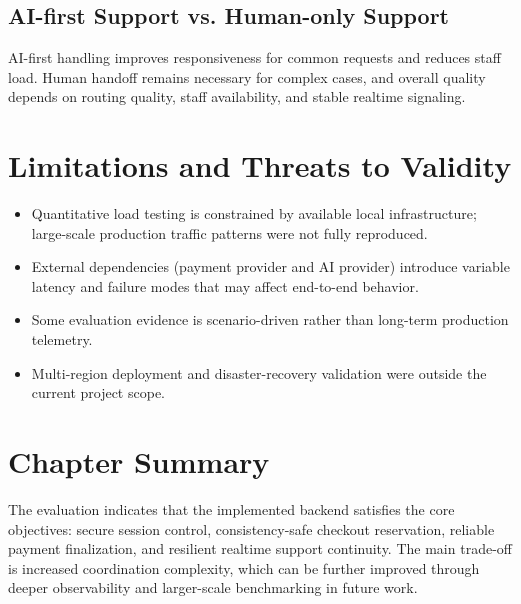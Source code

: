 \subsection{AI-first Support vs. Human-only Support}

AI-first handling improves responsiveness for common requests and reduces staff load. Human handoff remains necessary for complex cases, and overall quality depends on routing quality, staff availability, and stable realtime signaling.

\section{Limitations and Threats to Validity}

\begin{itemize}
    \item Quantitative load testing is constrained by available local infrastructure; large-scale production traffic patterns were not fully reproduced.
    \item External dependencies (payment provider and AI provider) introduce variable latency and failure modes that may affect end-to-end behavior.
    \item Some evaluation evidence is scenario-driven rather than long-term production telemetry.
    \item Multi-region deployment and disaster-recovery validation were outside the current project scope.
\end{itemize}

\section{Chapter Summary}

The evaluation indicates that the implemented backend satisfies the core objectives: secure session control, consistency-safe checkout reservation, reliable payment finalization, and resilient realtime support continuity. The main trade-off is increased coordination complexity, which can be further improved through deeper observability and larger-scale benchmarking in future work.
